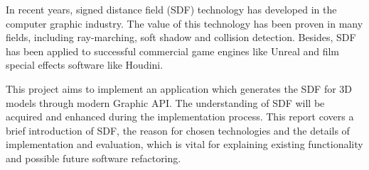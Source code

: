 In recent years, signed distance field (SDF) technology has developed in the computer graphic industry. The value of this technology has been proven in many fields, including ray-marching, soft shadow and collision detection. Besides, SDF has been applied to successful commercial game engines like Unreal and film special effects software like Houdini. 

\hspace*{\fill}

This project aims to implement an application which generates the SDF for 3D models through modern Graphic API. The understanding of SDF will be acquired and enhanced during the implementation process. This report covers a brief introduction of SDF, the reason for chosen technologies and the details of implementation and evaluation, which is vital for explaining existing functionality and possible future software refactoring.